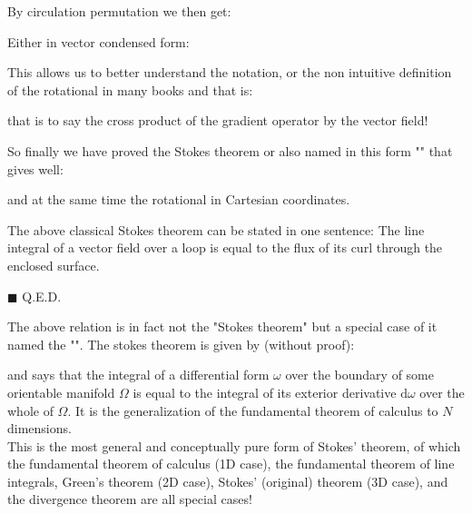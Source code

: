 \begin{dem}
	By circulation permutation we then get:
	
	Either in vector condensed form:
	
	This allows us to better understand the notation, or the non intuitive definition of the rotational in many books and that is:
	
	that is to say the cross product of the gradient operator by the vector field!
	
	So finally we have proved the Stokes theorem or also named in this form "" that gives well:
	
	and at the same time the rotational in Cartesian coordinates.
	
	The above classical Stokes theorem can be stated in one sentence: The line integral of a vector field over a loop is equal to the flux of its curl through the enclosed surface.
	\begin{flushright}
		$\blacksquare$  Q.E.D.
	\end{flushright}
	\end{dem}
	
	\begin{tcolorbox}[title=Remark,colframe=black,arc=10pt]
	The above relation is in fact not the "Stokes theorem" but a special case of it named the "". The stokes theorem is given by (without proof):
	
	and says that the integral of a differential form $\omega$ over the boundary of some orientable manifold $\Omega$ is equal to the integral of its exterior derivative $\mathrm{d}\omega $ over the whole of $\Omega$. It is the generalization of the fundamental theorem of calculus to $N$ dimensions.\\
	
	This  is  the  most  general  and  conceptually  pure  form  of  Stokes’  theorem,  of  which  the  fundamental  theorem  of calculus (1D case), the fundamental theorem of line integrals, Green’s theorem (2D case), Stokes’ (original) theorem (3D case), and the divergence theorem are all special cases!
	\end{tcolorbox}	
	
